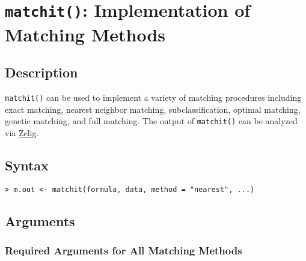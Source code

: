 \section{\texttt{matchit()}: Implementation of Matching Methods}
\label{sec:matchit}

\subsection{Description}

\texttt{matchit()} can be used to implement a variety of matching
procedures including exact matching, nearest neighbor matching,
subclassification, optimal matching, genetic matching, and full
matching. The output of {\tt matchit()} can be analyzed via
\href{http://gking.harvard.edu/zelig}{Zelig}.

\subsection{Syntax}
\begin{verbatim}
> m.out <- matchit(formula, data, method = "nearest", ...)
\end{verbatim}

\subsection{Arguments}

\subsubsection{Required Arguments for All Matching Methods}

